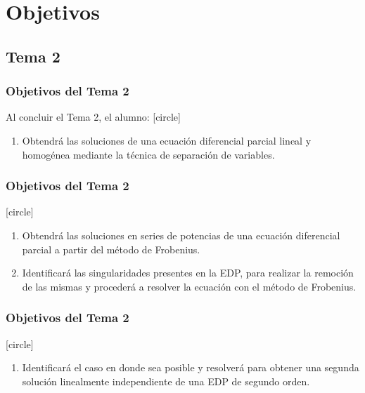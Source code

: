 \documentclass[12pt]{beamer}
\begin{document}
\section{Objetivos}
\subsection{Tema 2}

\begin{frame}
\frametitle{Objetivos del Tema 2}
Al concluir el Tema 2, el alumno:
[circle]
\begin{enumerate}
\item Obtendrá las soluciones de una ecuación diferencial parcial lineal y homogénea mediante la técnica de separación de variables.
\seti
\end{enumerate}
\end{frame}
\begin{frame}
\frametitle{Objetivos del Tema 2}
[circle]
\begin{enumerate}
\conti
\item Obtendrá las soluciones en series de potencias de una ecuación diferencial parcial a partir del método de Frobenius.
\item Identificará las singularidades presentes en la EDP, para realizar la remoción de las mismas y procederá a resolver la ecuación con el método de Frobenius.
\seti
\end{enumerate}
\end{frame}
\begin{frame}
\frametitle{Objetivos del Tema 2}
[circle]
\begin{enumerate}
\conti
\item Identificará el caso en donde sea posible y resolverá para obtener una segunda solución linealmente independiente de una EDP de segundo orden.
\seti
\end{enumerate}
\end{frame}
\end{document}
